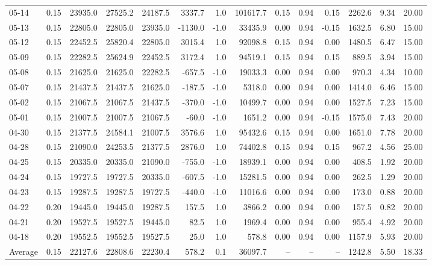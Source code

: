 \begin{threeparttable}
{\begin{tabular}{lrrrrrrrrrrrrr}
05-14 & 0.15 & 23935.0 & 27525.2 & 24187.5 & 3337.7 & 1.0 & 101617.7 & 0.15 & 0.94 & 0.15 & 2262.6 & 9.34 & 20.00 \\
05-13 & 0.15 & 22805.0 & 22805.0 & 23935.0 & -1130.0 & -1.0 & 33435.9 & 0.00 & 0.94 & -0.15 & 1632.5 & 6.80 & 15.00 \\
05-12 & 0.15 & 22452.5 & 25820.4 & 22805.0 & 3015.4 & 1.0 & 92098.8 & 0.15 & 0.94 & 0.00 & 1480.5 & 6.47 & 15.00 \\
05-09 & 0.15 & 22282.5 & 25624.9 & 22452.5 & 3172.4 & 1.0 & 94519.1 & 0.15 & 0.94 & 0.15 & 889.5 & 3.94 & 15.00 \\
05-08 & 0.15 & 21625.0 & 21625.0 & 22282.5 & -657.5 & -1.0 & 19033.3 & 0.00 & 0.94 & 0.00 & 970.3 & 4.34 & 10.00 \\
05-07 & 0.15 & 21437.5 & 21437.5 & 21625.0 & -187.5 & -1.0 & 5318.0 & 0.00 & 0.94 & 0.00 & 1414.0 & 6.46 & 15.00 \\
05-02 & 0.15 & 21067.5 & 21067.5 & 21437.5 & -370.0 & -1.0 & 10499.7 & 0.00 & 0.94 & 0.00 & 1527.5 & 7.23 & 15.00 \\
05-01 & 0.15 & 21007.5 & 21007.5 & 21067.5 & -60.0 & -1.0 & 1651.2 & 0.00 & 0.94 & -0.15 & 1575.0 & 7.43 & 20.00 \\
04-30 & 0.15 & 21377.5 & 24584.1 & 21007.5 & 3576.6 & 1.0 & 95432.6 & 0.15 & 0.94 & 0.00 & 1651.0 & 7.78 & 20.00 \\
04-28 & 0.15 & 21090.0 & 24253.5 & 21377.5 & 2876.0 & 1.0 & 74402.8 & 0.15 & 0.94 & 0.15 & 967.2 & 4.56 & 25.00 \\
04-25 & 0.15 & 20335.0 & 20335.0 & 21090.0 & -755.0 & -1.0 & 18939.1 & 0.00 & 0.94 & 0.00 & 408.5 & 1.92 & 20.00 \\
04-24 & 0.15 & 19727.5 & 19727.5 & 20335.0 & -607.5 & -1.0 & 15281.5 & 0.00 & 0.94 & 0.00 & 262.5 & 1.29 & 20.00 \\
04-23 & 0.15 & 19287.5 & 19287.5 & 19727.5 & -440.0 & -1.0 & 11016.6 & 0.00 & 0.94 & 0.00 & 173.0 & 0.88 & 20.00 \\
04-22 & 0.20 & 19445.0 & 19445.0 & 19287.5 & 157.5 & 1.0 & 3866.2 & 0.00 & 0.94 & 0.00 & 157.5 & 0.82 & 20.00 \\
04-21 & 0.20 & 19527.5 & 19527.5 & 19445.0 & 82.5 & 1.0 & 1969.4 & 0.00 & 0.94 & 0.00 & 955.4 & 4.92 & 20.00 \\
04-18 & 0.20 & 19552.5 & 19552.5 & 19527.5 & 25.0 & 1.0 & 578.8 & 0.00 & 0.94 & 0.00 & 1157.9 & 5.93 & 20.00 \\
Average & 0.15 & 22127.6 & 22808.6 & 22230.4 & 578.2 & 0.1 & 36097.7 & -- & -- & -- & 1242.8 & 5.50 & 18.33 \\

\end{tabular}}
\end{threeparttable}
